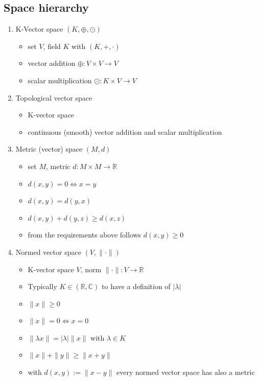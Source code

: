 \documentclass[10pt,a4paper]{article}
\theoremstyle{definition}
\begin{document}
\subsection{Space hierarchy}
\begin{enumerate}
    \item K-Vector space $(K,\oplus,\odot)$ 
        \begin{itemize}
            \item set $V$, field $K$ with $(K,+,\cdot)$
            \item vector addition $\oplus: V\times V\rightarrow V$
            \item scalar multiplication $\odot: K\times V\rightarrow V$
        \end{itemize}
    \item Topological vector space
        \begin{itemize}
            \item K-vector space
            \item continuous (smooth) vector addition and scalar multiplication
        \end{itemize}
    \item Metric (vector) space $(M,d)$
        \begin{itemize}
            \item set $M$, metric $d: M\times M\rightarrow \mathbb{R}$
            \item $d(x,y)=0 \Leftrightarrow x=y$
            \item $d(x,y)=d(y,x)$
            \item $d(x,y)+d(y,z) \ge d(x,z)$
            \item from the requirements above follows $d(x,y)\ge0$
        \end{itemize}
    \item Normed vector space $(V,\|\cdot\|)$
        \begin{itemize}
            \item K-vector space $V$, norm $\|\cdot\|: V\rightarrow \mathbb{R}$
            \item Typically $K\in(\mathbb{R}, \mathbb{C})$ to have a definition of $|\lambda|$
            \item $\|x\|\ge0$
            \item $\|x\|=0 \Leftrightarrow x=0$
            \item $\|\lambda x\|=|\lambda| \|x\|$ with $\lambda\in K$
            \item $\|x\|+\|y\|\ge\|x+y\|$
            \item with $d(x,y):=\|x-y\|$ every normed vector space has also a metric

\end{itemize}
\end{enumerate}
\end{document}

